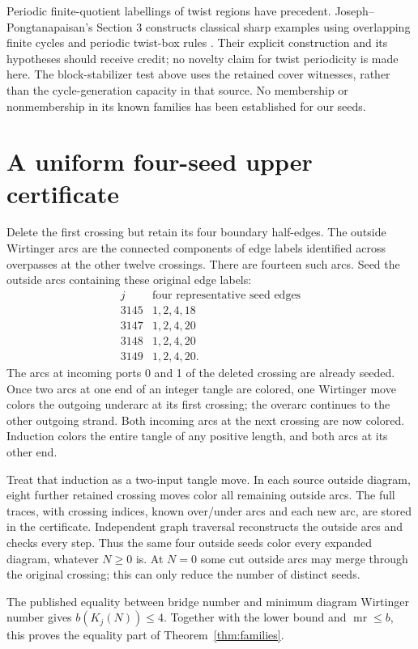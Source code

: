 \documentclass[11pt]{article}
\newcommand{\mr}{\operatorname{mr}}
\begin{document}
Periodic finite-quotient labellings of twist regions have
precedent. Joseph--Pongtanapaisan's Section 3 constructs
classical sharp examples using overlapping finite cycles
and periodic twist-box rules \cite{jp}. Their explicit
construction and its hypotheses should receive credit;
no novelty claim for twist periodicity is made here.
The block-stabilizer test above uses the retained cover
witnesses, rather than the cycle-generation capacity in
that source. No membership or nonmembership in its known
families has been established for our seeds.

\section{A uniform four-seed upper certificate}

Delete the first crossing but retain its four boundary
half-edges. The outside Wirtinger arcs are the connected
components of edge labels identified across overpasses at
the other twelve crossings. There are fourteen such arcs.
Seed the outside arcs containing these original edge labels:
\[
\begin{array}{c|c}
j&\text{four representative seed edges}\\\hline
3145&1,2,4,18\\
3147&1,2,4,20\\
3148&1,2,4,20\\
3149&1,2,4,20.
\end{array}
\]
The arcs at incoming ports 0 and 1 of the deleted crossing
are already seeded. Once two arcs at one end of an integer
tangle are colored, one Wirtinger move colors the outgoing
underarc at its first crossing; the overarc continues to
the other outgoing strand. Both incoming arcs at the next
crossing are now colored. Induction colors the entire
tangle of any positive length, and both arcs at its other end.

Treat that induction as a two-input tangle move. In each
source outside diagram, eight further retained crossing
moves color all remaining outside arcs. The full traces,
with crossing indices, known over/under arcs and each new
arc, are stored in the certificate. Independent graph
traversal reconstructs the outside arcs and checks every
step. Thus the same four outside seeds color every expanded
diagram, whatever $N\ge0$ is. At $N=0$ some cut outside arcs
may merge through the original crossing; this can only
reduce the number of distinct seeds.

The published equality between bridge number and minimum
diagram Wirtinger number \cite{wirt} gives $b(K_j(N))\le4$.
Together with the lower bound and $\mr\le b$, this proves
the equality part of Theorem~\ref{thm:families}.
\end{document}
